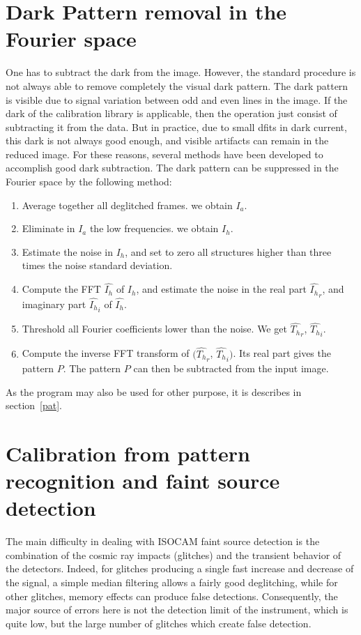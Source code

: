 \clearpage
\section{Dark Pattern removal in the Fourier space}
One has to subtract the dark from the image. However, the standard
procedure is not always  able to remove completely the visual dark
pattern. The dark pattern is visible due to signal variation between
odd and even lines in the image.
If the dark of the calibration library is applicable, then the operation
just consist of subtracting it from the data.
But in practice, due to small dfits in dark current, this dark is not always good 
enough, and visible 
artifacts can remain in the reduced image. For these reasons,
several methods have been developed \cite{iso:bure96,starck:tr_dark96}
 to accomplish good dark subtraction. 
The dark pattern can be suppressed in the Fourier space by the
following method:

\begin{enumerate}
\item Average together all deglitched frames. we obtain $I_a$.

\item Eliminate in $I_a$ the low frequencies. we obtain $I_h$.

\item Estimate the noise in $I_h$, and set to zero all structures 
higher than three times the noise standard deviation.

\item Compute the FFT $\hat{I_h}$ of $I_h$, and estimate the noise in the
real part $\hat{I_h}_r$, and imaginary part $\hat{I_h}_i$ of
$\hat{I_h}$.

\item Threshold all Fourier coefficients lower than the noise. 
We get $\hat{T_h}_r$, $\hat{T_h}_i$.

\item Compute the inverse FFT transform of 
$(\hat{T_h}_r$, $\hat{T_h}_i)$. Its real part gives the pattern
$P$.  The pattern $P$ can then be subtracted from the input image.
\end{enumerate}
As the program may also be used for other purpose, it is describes in
section~\ref{pat}.

\section{Calibration from pattern recognition and faint source detection}
The main difficulty in 
dealing with ISOCAM faint source detection is the combination of the cosmic 
ray impacts (glitches) and the transient behavior of the detectors. 
Indeed, for glitches producing a single fast increase and decrease of 
the signal, a simple median filtering allows a fairly good deglitching,
while for other glitches, memory effects can produce false 
detections. Consequently, the major source of errors here is not the 
detection limit of the instrument, which is quite low, but the large 
number of glitches which create false detection.

